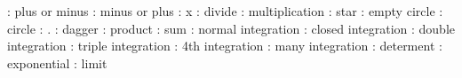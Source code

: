 \pm : plus or minus
\pm : minus or plus
\times : x
\div : divide
\ast : multiplication
\star : star
\circ : empty circle
\bullet : circle
\cdot : .
\dagger : dagger
\prod : product 
\sum : sum
\int : normal integration
\oint : closed integration
\iint : double integration
\iiint : triple integration
\iiiint : 4th integration
\idotsint : many integration
\det : determent
\exp : exponential
\lim : limit